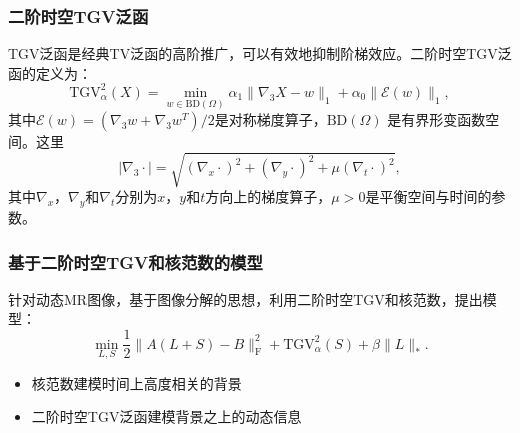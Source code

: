 \documentclass{beamer}
\begin{document}
%

\begin{frame}
\frametitle{二阶时空TGV泛函}
	TGV泛函是经典TV泛函的高阶推广，可以有效地抑制阶梯效应。二阶时空TGV泛函的定义为：
    $$\mathrm{TGV}_\alpha^2(X)=\min_{w\in \mathrm{BD}(\Omega)}\alpha_1\|\nabla_3 X-w\|_1 + \alpha_0\|\mathcal{E}(w)\|_1,$$
其中$\mathcal{E}(w)=(\nabla_3w+\nabla_3w^{T})/2$是对称梯度算子，$\mathrm{BD}(\Omega)$ 是有界形变函数空间。这里
$$|\nabla_3\cdot| = \sqrt{(\nabla_x\cdot)^2+(\nabla_y\cdot)^2+\mu(\nabla_t\cdot)^2},$$
其中$\nabla_x$，$\nabla_y$和$\nabla_t$分别为$x$，$y$和$t$方向上的梯度算子，$\mu>0$是平衡空间与时间的参数。
\end{frame}

\begin{frame}
	\frametitle{基于二阶时空TGV和核范数的模型}
针对动态MR图像，基于图像分解的思想，利用二阶时空TGV和核范数，提出模型：
\begin{equation}
\min_{L,S} \frac{1}{2}\|A(L+S)-B\|_{\mathrm{F}}^2+\mathrm{TGV}^2_\alpha(S)+\beta\|L\|_*.
\label{propopsed}
\end{equation}
\begin{itemize}
	\item 核范数建模时间上高度相关的背景
	\item 二阶时空TGV泛函建模背景之上的动态信息
\end{itemize}
\end{frame}
\end{document}

